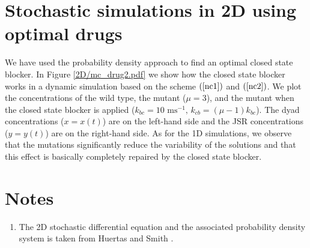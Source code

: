 
\section{Stochastic simulations in 2D using optimal drugs}

We have used the probability density approach to find an optimal closed state blocker. In Figure \ref{2D/mc_drug2.pdf} 
we show how the closed state blocker works in a dynamic simulation based on the scheme 
$(\ref{nc1})$ and $(\ref{nc2})$. We plot the concentrations of the wild type, the mutant ($\mu=3$), and the mutant when the closed state blocker is applied ($k_{bc}=10 \text{ ms}^{-1},\, k_{cb}=(\mu-1)k_{bc}$). The dyad concentrations ($x=x(t)$) are on the left-hand side and the JSR concentrations
($y=y(t)$) are on the right-hand side. As for the 1D simulations, we observe that the mutations significantly reduce the variability of the solutions and that this effect is basically completely repaired by the closed state blocker.


\section{Notes}

\begin{enumerate}
\item The 2D stochastic differential equation and the associated probability density system
is taken from  Huertas and Smith \cite{Huertas2007}.
\end{enumerate}

